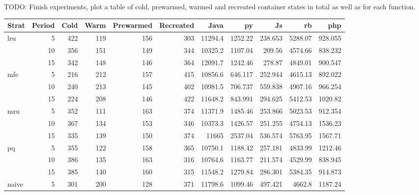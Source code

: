 \documentclass{article}
\begin{document}
TODO: Finish experiments, plot a table of cold, prewarmed, warmed and recreated container states in total as well as for each function.

\begin{center}
\begin{tabular}{lrrrrrrrrrr}
    \hline
     Strat   &   Period &   Cold &   Warm &   Prewarmed &   Recreated &    Java &       py &      Js &      rb &      php \\
    \hline
     \multirow{3}{*}{lru}     &        5 &    422 &    119 &         156 &         303 & 11294.4 & 1252.22  & 238.653 & 5288.07 &  928.055 \\
          &       10 &    356 &    151 &         149 &         344 & 10325.2 & 1107.04  & 209.56  & 4574.66 &  838.232 \\
          &       15 &    342 &    148 &         146 &         364 & 12091.7 & 1242.46  & 278.87  & 4849.01 &  900.547 \\
    \multirow{3}{*}{mfe}     &        5 &    216 &    212 &         157 &         415 & 10856.6 &  646.117 & 252.944 & 4615.13 &  892.022 \\
          &       10 &    240 &    213 &         145 &         402 & 10981.5 &  706.737 & 559.838 & 4907.16 &  966.254 \\
          &       15 &    224 &    208 &         146 &         422 & 11648.2 &  843.991 & 294.625 & 5412.53 & 1020.82  \\
    \multirow{3}{*}{mru}     &        5 &    352 &    111 &         163 &         374 & 11371.9 & 1485.46  & 253.866 & 5023.53 &  912.354 \\
          &       10 &    367 &    134 &         153 &         346 & 10373.3 & 1426.57  & 251.255 & 4754.13 & 1536.23  \\
          &       15 &    335 &    139 &         150 &         374 & 11665   & 2537.04  & 536.574 & 5763.95 & 1567.71  \\
    \multirow{3}{*}{pq}     &        5 &    355 &    122 &         158 &         365 & 10750.1 & 1188.42  & 257.181 & 4833.99 & 1212.46  \\
          &       10 &    386 &    135 &         163 &         316 & 10764.6 & 1163.77  & 211.574 & 4529.99 &  838.945 \\
          &       15 &    385 &    140 &         160 &         315 & 11548.2 & 1279.84  & 286.301 & 5384.35 &  914.873 \\
     naive   &        5 &    301 &    200 &         128 &         371 & 11798.6 & 1099.46  & 497.421 & 4662.8  & 1187.24  \\
    \hline
\end{tabular}
\end{center}
\end{document}
